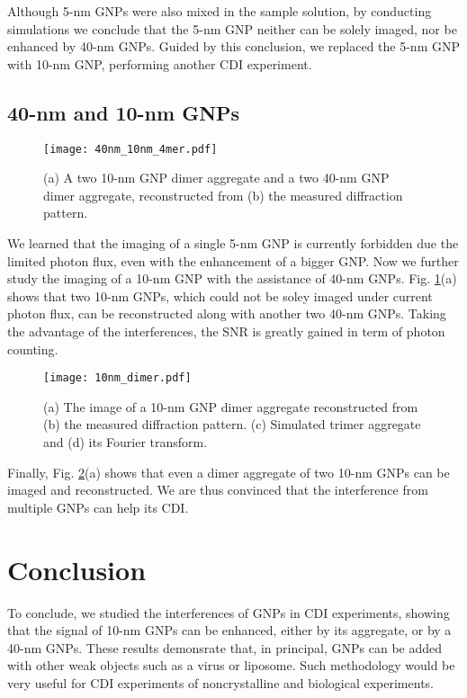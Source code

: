 \documentclass[10pt,letterpaper]{article}
\begin{document}
Although 5-nm GNPs were also mixed in the sample solution, by conducting simulations we conclude that the 5-nm GNP neither can be solely imaged, nor be enhanced by 40-nm GNPs.
Guided by this conclusion, we replaced the 5-nm GNP with 10-nm GNP, performing another CDI experiment.


\subsection{40-nm and 10-nm GNPs}

\begin{figure}
	\centering
	\texttt{[image: 40nm\_10nm\_4mer.pdf]}%
	\caption{(a) A two 10-nm GNP dimer aggregate and a two 40-nm GNP dimer aggregate, reconstructed from (b) the measured diffraction pattern.}
	\label{fig:40nm_10nm_4mer}
\end{figure}

We learned that the imaging of a single 5-nm GNP is currently forbidden due the limited photon flux, even with the enhancement of a bigger GNP. Now we further study the imaging of a 10-nm GNP with the assistance of 40-nm GNPs. Fig. \ref{fig:40nm_10nm_4mer}(a) shows that two 10-nm GNPs, which could not be soley imaged under current photon flux, can be reconstructed along with another two 40-nm GNPs. 
Taking the advantage of the interferences, the SNR is greatly gained in term of photon counting.

\begin{figure}
	\centering
	\texttt{[image: 10nm\_dimer.pdf]}%
	\caption{(a) The image of a 10-nm GNP dimer aggregate reconstructed from (b) the measured diffraction pattern. (c) Simulated trimer aggregate and (d) its Fourier transform.}
	\label{fig:10nm_dimer}
\end{figure}

Finally, Fig. \ref{fig:10nm_dimer}(a) shows that even a dimer aggregate of two 10-nm GNPs can be imaged and reconstructed.
We are thus convinced that the interference from multiple GNPs can help its CDI.

\section{Conclusion}

To conclude, we studied the interferences of GNPs in CDI experiments, showing that the signal of 10-nm GNPs can be enhanced, either by its aggregate, or by a 40-nm GNPs. 
These results demonsrate that, in principal, GNPs can be added with other weak objects such as a virus or liposome.
Such methodology would be very useful for CDI experiments of noncrystalline and biological experiments.
\end{document}
